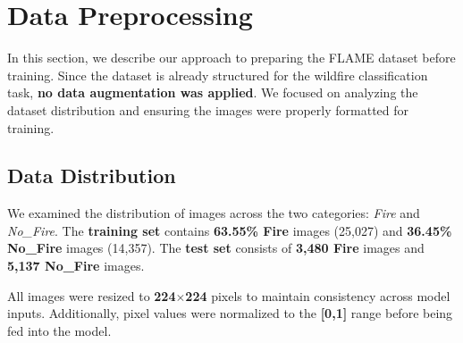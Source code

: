 \section{Data Preprocessing}
\label{sec:data-preprocessing}

In this section, we describe our approach to preparing the FLAME dataset before training.
Since the dataset is already structured for the wildfire classification task, \textbf{no data augmentation was applied}.
We focused on analyzing the dataset distribution and ensuring the images were properly formatted for training.

\subsection{Data Distribution}
\label{subsec:data-distribution}

We examined the distribution of images across the two categories: \textit{Fire} and \textit{No\_Fire}.
The \textbf{training set} contains \textbf{63.55\% Fire} images (25,027) and \textbf{36.45\% No\_Fire} images (14,357).
The \textbf{test set} consists of \textbf{3,480 Fire} images and \textbf{5,137 No\_Fire} images.

All images were resized to \textbf{224\(\times\)224} pixels to maintain consistency across model inputs.
Additionally, pixel values were normalized to the \textbf{[0,1]} range before being fed into the model.

